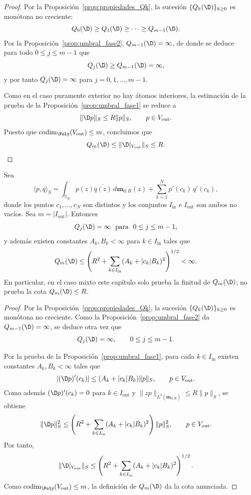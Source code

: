 \begin{proof}
	Por la Proposición~\ref{prop:propiedades_Qk}, la sucesión $\{Q_k(\D)\}_{k\ge0}$ es monótona no creciente:
	\[
		Q_0(\D)\ge Q_1(\D)\ge\cdots\ge Q_{m-1}(\D).
	\]
	Por la Proposición~\ref{prop:umbral_fase2}, $Q_{m-1}(\D)=\infty$, de donde se deduce para todo $0\le j\le m-1$ que
	\[
		Q_j(\D)\ge Q_{m-1}(\D)=\infty,
	\]
	y por tanto $Q_j(\D)=\infty$ para $j=0,1,\dots,m-1$.

	Como en el caso puramente exterior no hay átomos interiores, la estimación de la prueba de la Proposición~\ref{prop:umbral_fase1} se reduce a
	\[
		\|\D p\|_S\le R\|p\|_S,
		\qquad p\in V_{\mathrm{out}}.
	\]
	Puesto que $\operatorname{codim}_{\Poly}(V_{\mathrm{out}})\le m$, concluimos que
	\[
		Q_m(\D)\le \|\D|_{V_{\mathrm{out}}}\|_S\le R.
	\]
\end{proof}

\begin{thm}
	\label{thm:umbral_caso_mixto}
	Sea
	\[
		\langle p,q\rangle_S
		=
		\int_{\mathbb{S}_R} p(z)\overline{q(z)}\,d\mathbf{m}_{0;R}(z)
		+
		\sum_{k=1}^{N} p'(c_k)\,\overline{q'(c_k)},
	\]
	donde los puntos $c_1,\dots,c_N$ son distintos y los conjuntos $I_{\mathrm{in}}$ e $I_{\mathrm{out}}$ son ambos no vacíos. Sea $m=|I_{\mathrm{out}}|$. Entonces
	\[
		Q_j(\D)=\infty\ \text{ para }\ 0\le j\le m-1,
	\]
	y además existen constantes $A_k,B_k<\infty$ para $k\in I_{\mathrm{in}}$ tales que
	\[
		Q_m(\D)
		\le
		\left(
		R^2+\sum_{k\in I_{\mathrm{in}}}(A_k+|c_k|B_k)^2
		\right)^{1/2}
		<\infty.
	\]
	En particular, en el caso mixto este capítulo solo prueba la finitud de $Q_m(\D)$; no prueba la cota $Q_m(\D)\le R$.
\end{thm}

\begin{proof}
	Por la Proposición~\ref{prop:propiedades_Qk}, la sucesión $\{Q_k(\D)\}_{k\ge0}$ es monótona no creciente. Como la Proposición~\ref{prop:umbral_fase2} da $Q_{m-1}(\D)=\infty$, se deduce otra vez que
	\[
		Q_j(\D)=\infty,
		\qquad 0\le j\le m-1.
	\]

	Por la prueba de la Proposición~\ref{prop:umbral_fase1}, para cada $k\in I_{\mathrm{in}}$ existen constantes $A_k,B_k<\infty$ tales que
	\[
		|(\D p)'(c_k)|\le (A_k+|c_k|B_k)\|p\|_S,
		\qquad p\in V_{\mathrm{out}}.
	\]
	Como además $(\D p)'(c_k)=0$ para $k\in I_{\mathrm{out}}$ y $\|zp\|_{L^2(\mathbf m_{0;R})}\le R\|p\|_S$, se obtiene
	\[
		\|\D p\|_S^2
		\le
		\left(
		R^2+\sum_{k\in I_{\mathrm{in}}}(A_k+|c_k|B_k)^2
		\right)\|p\|_S^2,
		\qquad p\in V_{\mathrm{out}}.
	\]
	Por tanto,
	\[
		\|\D|_{V_{\mathrm{out}}}\|_S
		\le
		\left(
		R^2+\sum_{k\in I_{\mathrm{in}}}(A_k+|c_k|B_k)^2
		\right)^{1/2}.
	\]
	Como $\operatorname{codim}_{\Poly}(V_{\mathrm{out}})\le m$, la definición de $Q_m(\D)$ da la cota anunciada.
\end{proof}

